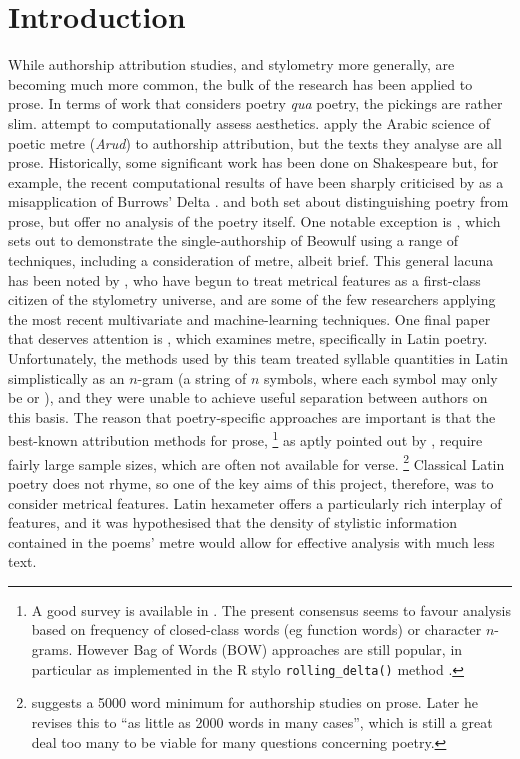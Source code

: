 \documentclass[11pt,a4paper]{scrartcl} %
\begin{document}
\setlength{\parindent}{0.3in}\section{Introduction}
While authorship attribution studies, and stylometry more generally, are becoming much more common, the bulk of the research has been applied to prose. In terms of work that considers poetry \textit{qua} poetry, the pickings are rather slim.  attempt to computationally assess aesthetics.  apply the Arabic science of poetic metre (\textit{Arud}) to authorship attribution, but the texts they analyse are all prose. Historically, some significant work has been done on Shakespeare but, for example, the recent computational results of  have been sharply criticised by  as a misapplication of Burrows' Delta \cite{burrows_delta:_2002}.  and  both set about distinguishing poetry from prose, but offer no analysis of the poetry itself. One notable exception is , which sets out to demonstrate the single-authorship of Beowulf using a range of techniques, including a consideration of metre, albeit brief. This general lacuna has been noted by , who have begun to treat metrical features as a first-class citizen of the stylometry universe, and are some of the few researchers applying the most recent multivariate and machine-learning techniques. One final paper that deserves attention is , which examines metre, specifically in Latin poetry. Unfortunately, the methods used by this team treated syllable quantities in Latin simplistically as an $n$-gram (a string of $n$ symbols, where each symbol may only be  or \metricsymbols{_}), and they were unable to achieve useful separation between authors on this basis. The reason that poetry-specific approaches are important is that the best-known attribution methods for prose,%
%
\footnote{A good survey is available in . The present consensus seems to favour analysis based on frequency of closed-class words (eg function words) or character $n$-grams. However Bag of Words (BOW) approaches are still popular, in particular as implemented in the R stylo \texttt{rolling\_delta()} method .}
as aptly pointed out by , require fairly large sample sizes, which are often not available for verse.%
%
\footnote{ suggests a 5000 word minimum for authorship studies on prose. Later \citeyear[4]{eder_short_2017} he revises this to ``as little as 2000 words in many cases'', which is still a great deal too many to be viable for many questions concerning poetry.}
%
Classical Latin poetry does not rhyme, so one of the key aims of this project, therefore, was to consider metrical features. Latin hexameter offers a particularly rich interplay of features, and it was hypothesised that the density of stylistic information contained in the poems' metre would allow for effective analysis with much less text.
\end{document}
